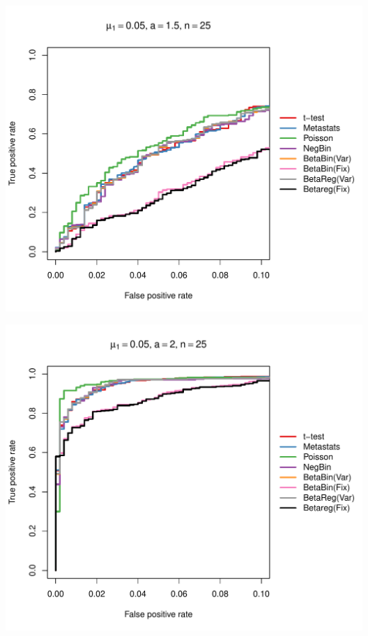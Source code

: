 \documentclass[12pt]{article}\usepackage{graphicx, color}
\makeatletter
\def\maxwidth{ %
  \ifdim\Gin@nat@width>\linewidth
    \linewidth
  \else
    \Gin@nat@width
  \fi
}
\newenvironment{knitrout}{}{} %
\makeatother
\begin{document}
\begin{knitrout}
{\centering \includegraphics[width=\maxwidth]{figure/rocs31} 

}




{\centering \includegraphics[width=\maxwidth]{figure/rocs32} 

}





\end{knitrout}
\end{document}
